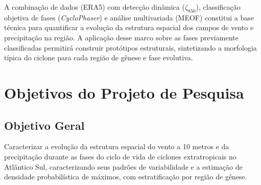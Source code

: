 A combinação de dados (ERA5) com detecção dinâmica ($\zeta_{850}$), classificação objetiva de fases (\textit{CycloPhaser}) e análise multivariada (MEOF) constitui a base técnica para quantificar a evolução da estrutura espacial dos campos de vento e precipitação na região.
A aplicação desse marco sobre as fases previamente classificadas permitirá construir protótipos estruturais, sintetizando a morfologia típica do ciclone para cada região de gênese e fase evolutiva.


\section{Objetivos do Projeto de Pesquisa}

\subsection{Objetivo Geral}
Caracterizar a evolução da estrutura espacial do vento a 10 metros e da precipitação durante as fases do ciclo de vida de ciclones extratropicais no Atlântico Sul, caracterizando seus padrões de variabilidade e a estimação de densidade probabilística de máximos, com estratificação por região de gênese.

